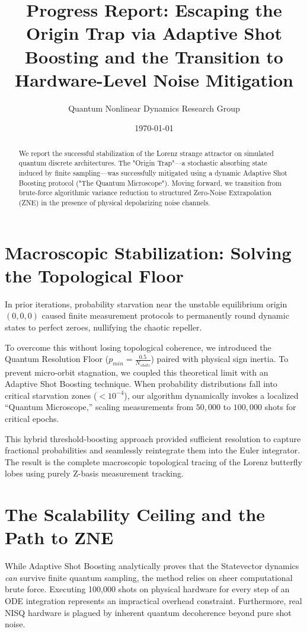 \documentclass[11pt,a4paper]{article}
\title{Progress Report: Escaping the Origin Trap via Adaptive Shot Boosting and the Transition to Hardware-Level Noise Mitigation}
\author{Quantum Nonlinear Dynamics Research Group}
\date{\today}
\begin{document}
\maketitle

\begin{abstract}
We report the successful stabilization of the Lorenz strange attractor on simulated quantum discrete architectures. The "Origin Trap"—a stochastic absorbing state induced by finite sampling—was successfully mitigated using a dynamic Adaptive Shot Boosting protocol ("The Quantum Microscope"). Moving forward, we transition from brute-force algorithmic variance reduction to structured Zero-Noise Extrapolation (ZNE) in the presence of physical depolarizing noise channels.
\end{abstract}

\section{Macroscopic Stabilization: Solving the Topological Floor}
In prior iterations, probability starvation near the unstable equilibrium origin $(0,0,0)$ caused finite measurement protocols to permanently round dynamic states to perfect zeroes, nullifying the chaotic repeller. 

To overcome this without losing topological coherence, we introduced the Quantum Resolution Floor ($p_{min} = \frac{0.5}{N_{shots}}$) paired with physical sign inertia. To prevent micro-orbit stagnation, we coupled this theoretical limit with an Adaptive Shot Boosting technique. When probability distributions fall into critical starvation zones ($< 10^{-4}$), our algorithm dynamically invokes a localized ``Quantum Microscope,'' scaling measurements from $50,000$ to $100,000$ shots for critical epochs. 

This hybrid threshold-boosting approach provided sufficient resolution to capture fractional probabilities and seamlessly reintegrate them into the Euler integrator. The result is the complete macroscopic topological tracing of the Lorenz butterfly lobes using purely Z-basis measurement tracking.

\section{The Scalability Ceiling and the Path to ZNE}
While Adaptive Shot Boosting analytically proves that the Statevector dynamics \textit{can} survive finite quantum sampling, the method relies on sheer computational brute force. Executing 100,000 shots on physical hardware for every step of an ODE integration represents an impractical overhead constraint. Furthermore, real NISQ hardware is plagued by inherent quantum decoherence beyond pure shot noise.
\end{document}
